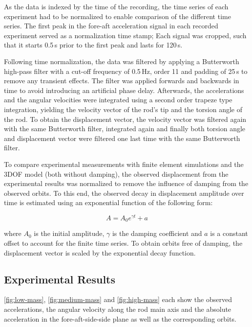 \documentclass{article}
\begin{document}
As the data is indexed by the time of the recording, the time series of each experiment had to be normalized to enable comparison of the different time series. The first peak in the fore-aft acceleration signal in each recorded experiment served as a normalization time stamp; Each signal was cropped, such that it starts 0.5\,s prior to the first peak and lasts for 120\,s. 

Following time normalization, the data was filtered by applying a Butterworth high-pass filter with a cut-off frequency of 0.5\,Hz, order 11 and padding of 25\,s to remove any transient effects. The filter was applied forwards and backwards in time to avoid introducing an artificial phase delay. Afterwards, the accelerations and the angular velocities were integrated using a second order trapeze type integration, yielding the velocity vector of the rod's tip and the torsion angle of the rod. To obtain the displacement vector, the velocity vector was filtered again with the same Butterworth filter, integrated again and finally both torsion angle and displacement vector were filtered one last time with the same Butterworth filter.

To compare experimental measurements with finite element simulations and the 3DOF model (both without damping), the observed displacement from the experimental results was normalized to remove the influence of damping from the observed orbits. To this end, the observed decay in displacement amplitude over time is estimated using an exponential function of the following form:

\begin{equation}
    A = A_0 e ^ {\gamma t} + a
\end{equation}

where $A_0$ is the initial amplitude, $\gamma$ is the damping coefficient and $a$ is a constant offset to account for the finite time series. To obtain orbits free of damping, the displacement vector is scaled by the exponential decay function. 

\subsection{Experimental Results}

\autoref{fig:low-mass}, \autoref{fig:medium-mass} and \autoref{fig:high-mass} each show the observed accelerations, the angular velocity along the rod main axis and the absolute acceleration in the fore-aft-side-side plane as well as the corresponding orbits.
\end{document}
